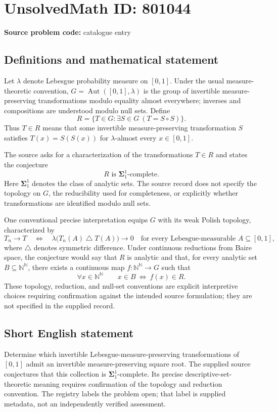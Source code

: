 \documentclass[11pt]{article}
\newcommand{\N}{\mathbb{N}}
\begin{document}
\section*{UnsolvedMath ID: 801044}
\textbf{Source problem code:} catalogue entry
\subsection{Definitions and mathematical statement}
Let \(\lambda\) denote Lebesgue probability measure on \([0,1]\). Under the usual measure-theoretic convention, \(G=\operatorname{Aut}([0,1],\lambda)\) is the group of invertible measure-preserving transformations modulo equality almost everywhere; inverses and compositions are understood modulo null sets. Define
\[
R=\{T\in G:\exists S\in G\ (T=S\circ S)\}.
\]
Thus \(T\in R\) means that some invertible measure-preserving transformation \(S\) satisfies \(T(x)=S(S(x))\) for \(\lambda\)-almost every \(x\in[0,1]\).

The source asks for a characterization of the transformations \(T\in R\) and states the conjecture
\[
R\text{ is }\boldsymbol{\Sigma}^{1}_{1}\text{-complete}.
\]
Here \(\boldsymbol{\Sigma}^{1}_{1}\) denotes the class of analytic sets. The source record does not specify the topology on \(G\), the reducibility used for completeness, or explicitly whether transformations are identified modulo null sets.

One conventional precise interpretation equips \(G\) with its weak Polish topology, characterized by
\[
T_n\longrightarrow T
\quad\Longleftrightarrow\quad
\lambda\bigl(T_n(A)\mathbin{\triangle}T(A)\bigr)\longrightarrow0
\quad\text{for every Lebesgue-measurable }A\subseteq[0,1],
\]
where \(\triangle\) denotes symmetric difference. Under continuous reductions from Baire space, the conjecture would say that \(R\) is analytic and that, for every analytic set \(B\subseteq\N^{\N}\), there exists a continuous map \(f:\N^{\N}\to G\) such that
\[
\forall x\in\N^{\N}\qquad
x\in B\ \Longleftrightarrow\ f(x)\in R.
\]
These topology, reduction, and null-set conventions are explicit interpretive choices requiring confirmation against the intended source formulation; they are not specified in the supplied record.
\subsection{Short English statement}
Determine which invertible Lebesgue-measure-preserving transformations of \([0,1]\) admit an invertible measure-preserving square root. The supplied source conjectures that this collection is \(\boldsymbol{\Sigma}^{1}_{1}\)-complete. Its precise descriptive-set-theoretic meaning requires confirmation of the topology and reduction convention. The registry labels the problem open; that label is supplied metadata, not an independently verified assessment.
\end{document}
